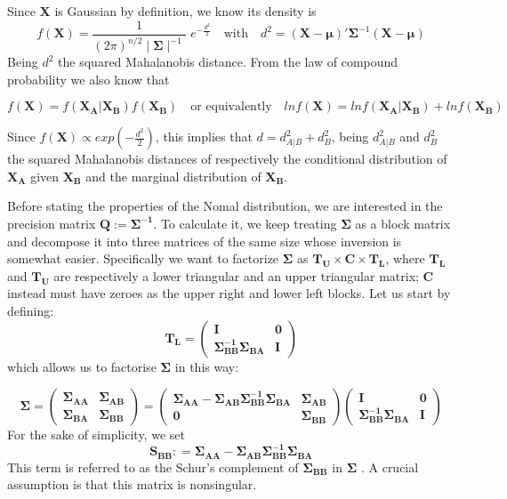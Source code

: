 \documentclass{book}
\begin{document}
	Since $\mathbf{X}$ is Gaussian by definition, we know its density is
	$$ f(\mathbf{X}) = \frac{1}{(2 \pi)^{n/2} \mid \mathbf{\Sigma} \mid ^{-1}} \, \, e^{-\frac{d^2}{2}} \quad \text{with} \quad  d^2 = (\mathbf{X} - \mathbf{\mu})' \mathbf{\Sigma}^{-1} (\mathbf{X} - \mathbf{\mu}) $$
	Being $d^2$ the squared Mahalanobis distance. 
	From the law of compound probability we also know that 
    
    $$f(\mathbf{X}) = f(\mathbf{X_A}|\mathbf{X_B}) f(\mathbf{X_B}) \quad \text{or equivalently} \quad ln f(\mathbf{X}) = ln f(\mathbf{X_A}|\mathbf{X_B}) + ln f(\mathbf{X_B})$$ 

    
	Since $f(\mathbf{X}) \propto exp(-\frac{d^2}{2})$, this implies that $d = d^2_{A|B} + d^2_{B}$, being $d^2_{A|B}$ and $d^2_B$ the squared Mahalanobis distances of respectively the conditional distribution of $\mathbf{X_A}$ given $\mathbf{X_B}$ and the marginal distribution of $\mathbf{X_B}$.
 
 Before stating the properties of the Nomal distribution, we are interested in the precision matrix $\mathbf{Q} := \mathbf{\Sigma^{-1}}$. To calculate it, we keep treating $\mathbf{\Sigma}$ as a block matrix and decompose it into three matrices of the same size whose inversion is somewhat easier. Specifically we want to factorize $\mathbf{\Sigma}$ as $\mathbf{T_U} \times \mathbf{C} \times \mathbf{T_L}$, where $\mathbf{T_L}$ and $\mathbf{T_U}$ are respectively a lower triangular and an upper triangular matrix; $\mathbf{C}$ instead must have zeroes as the upper right and lower left blocks. Let us start by defining:
 $$
  \mathbf{T_L} = \left( \begin{array}{ll} 
 	\mathbf{I} & \mathbf{0}\\ 
 	\mathbf{\Sigma_{BB}^{-1}} \mathbf{\Sigma_{BA}} & \mathbf{I}
 \end{array}
 \right)
$$ 
which allows us to factorise $\mathbf{\Sigma}$ in this way:

$$
\mathbf{\Sigma} = \left( \begin{array}{ll} \mathbf{\Sigma_{AA}} & \mathbf{\Sigma_{AB}}
	\\ \mathbf{\Sigma_{BA}} & \mathbf{\Sigma_{BB}}  \end{array}
\right) = 
\left( \begin{array}{ll} \mathbf{\mathbf{\Sigma_{AA}} - \mathbf{\Sigma_{AB}} \mathbf{\Sigma^{-1}_{BB}} \mathbf{\Sigma_{BA}}} & \mathbf{\Sigma_{AB}}
	\\ \mathbf{0} & \mathbf{\Sigma_{BB}}  \end{array}
\right)
\left( \begin{array}{ll} 
	\mathbf{I} & \mathbf{0}\\ 
	\mathbf{\Sigma_{BB}^{-1}} \mathbf{\Sigma_{BA}} & \mathbf{I}
\end{array}
\right)
$$
For the sake of simplicity, we set 
$$\mathbf{S_{BB}} : =
\mathbf{\Sigma_{AA}} - \mathbf{\Sigma_{AB}} \mathbf{\Sigma^{-1}_{BB}} \mathbf{\Sigma_{BA}}
$$
This term is referred to as the Schur's complement of $\mathbf{\Sigma_{BB}}$ in $\mathbf{\Sigma}$ \citep[][paragraph 0.7.3]{HornJohnson}. A crucial assumption is that this matrix is nonsingular.
\end{document}
